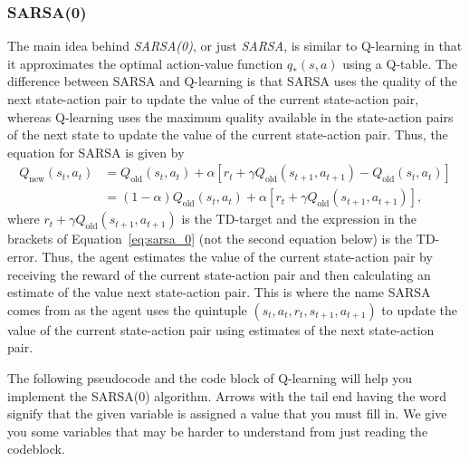 \subsubsection*{SARSA(0)}
The main idea behind \emph{SARSA(0)}, or just \emph{SARSA}, is similar to Q-learning in that it approximates the optimal action-value function $q_*(s,a)$ using a Q-table.
The difference between SARSA and Q-learning is that SARSA uses the quality of the next state-action pair to update the value of the current state-action pair, whereas Q-learning uses the maximum quality available in the state-action pairs of the next state to update the value of the current state-action pair.
Thus, the equation for SARSA is given by
\begin{align}
    Q_{\text{new}}(s_t,a_t) &= Q_{\text{old}}(s_t,a_t) + \alpha\left[r_{t} + \gamma Q_{\text{old}}(s_{t+1},a_{t+1}) - Q_{\text{old}}(s_t,a_t)\right] \label{eq:sarsa_0} \\
                            &= (1-\alpha)Q_{\text{old}}(s_t,a_t) + \alpha\left[r_{t} + \gamma Q_{\text{old}}(s_{t+1},a_{t+1})\right] \nonumber,
\end{align}
where $r_{t} + \gamma Q_{\text{old}}(s_{t+1},a_{t+1})$ is the TD-target and the expression in the brackets of Equation\ \ref{eq:sarsa_0} (not the second equation below) is the TD-error.
Thus, the agent estimates the value of the current state-action pair by receiving the reward of the current state-action pair and then calculating an estimate of the value next state-action pair.
This is where the name SARSA comes from as the agent uses the quintuple $(s_t,a_t,r_t,s_{t+1},a_{t+1})$ to update the value of the current state-action pair using estimates of the next state-action pair.

The following pseudocode and the code block of Q-learning will help you implement the SARSA(0) algorithm.
Arrows with the tail end having the word  signify that the given variable is assigned a value that you must fill in.
We give you some variables that may be harder to understand from just reading the  codeblock.

